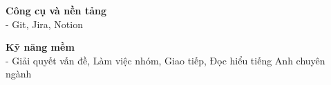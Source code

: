 \documentclass[10pt,a4paper]{article}
\begin{document}
\vspace{8pt}

\begin{minipage}[t]{0.5\textwidth}
    \textbf{\small Công cụ và nền tảng} \\[1pt]
    - Git, Jira, Notion 
\end{minipage}%
\begin{minipage}[t]{0.5\textwidth}
    \textbf{\small Kỹ năng mềm} \\[1pt]
    - Giải quyết vấn đề, Làm việc nhóm, Giao tiếp, Đọc hiểu tiếng Anh chuyên ngành
\end{minipage}
\end{document}
